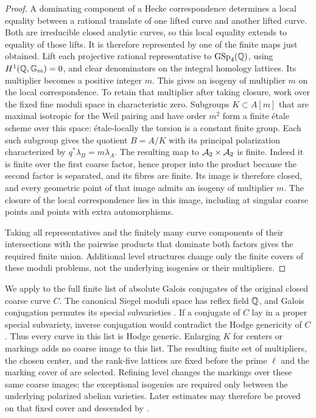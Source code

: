 \begin{proof}
A dominating component of a Hecke correspondence determines a local
equality between a rational translate of one lifted curve and another
lifted curve.  Both are irreducible closed analytic curves, so this
local equality extends to equality of those lifts.  It is therefore
represented by one of the finite maps just obtained.  Lift each
projective rational representative to $\operatorname{GSp}_4(\mathbb Q)$, using
$H^1(\mathbb Q,\mathbb G_m)=0$, and clear denominators on the integral homology
lattices.  Its multiplier becomes a positive integer $m$.  This gives an isogeny of multiplier $m$ on the local correspondence.
To retain that multiplier after taking closure, work over the fixed
fine moduli space in characteristic zero.  Subgroups
$K\subset A[m]$ that are maximal isotropic for the Weil pairing and
have order $m^2$ form a finite \'etale scheme over this space:
\'etale-locally the torsion is a constant finite group.  Each such
subgroup gives the quotient $B=A/K$ with its principal polarization
characterized by $q^*\lambda_B=m\lambda_A$.  The resulting map to
$\mathcal A_2\times\mathcal A_2$ is finite.  Indeed it is finite over the first
coarse factor, hence proper into the product because the second
factor is separated, and its fibres are finite.  Its image is
therefore closed, and every geometric point of that image admits an
isogeny of multiplier $m$.  The closure of the local correspondence
lies in this image, including at singular coarse points and points
with extra automorphisms.

Taking all representatives and the finitely many curve components of
their intersections with the pairwise products that dominate both factors
gives the required finite union.  Additional level structures change only
the finite covers of these moduli problems, not the underlying
isogenies or their multipliers.
\end{proof}

We apply  to the full finite list of
absolute Galois conjugates of the original closed coarse curve $C$.
The canonical Siegel moduli space has reflex field $\mathbb Q$, and Galois
conjugation permutes its special subvarieties
\cite[Corollary~5.3, arXiv version~2]{Orr2021}.  If a conjugate of $C$ lay in a proper
special subvariety, inverse conjugation would contradict the Hodge
genericity of $C$.  Thus every curve in this list is Hodge generic.
Enlarging $K$ for centers or markings adds no coarse image to this
list.  The resulting finite set of multipliers, the chosen center,
and the rank-five lattices are fixed before the prime $\ell$ and the
marking cover of  are selected.  Refining level changes
the markings over these same coarse images; the exceptional isogenies
are required only between the underlying polarized abelian varieties.
Later estimates may therefore be proved on that fixed cover and
descended by .
